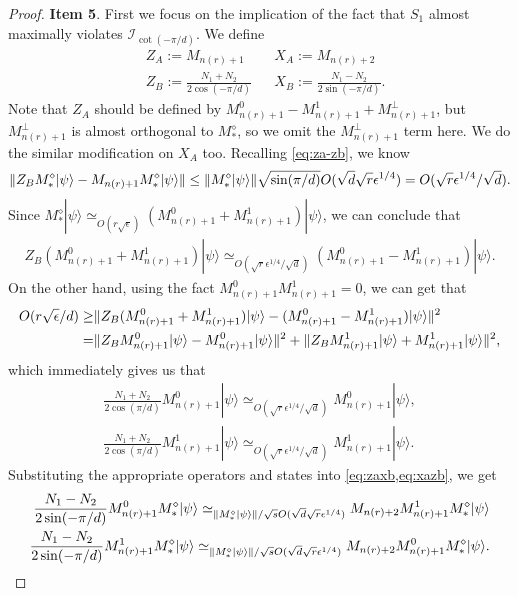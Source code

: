 \documentclass[11pt,letterpaper]{article}
\newcommand{\ket}[1]{|#1\rangle}
\DeclarePairedDelimiter{\norm}{\lVert}{\rVert}
\newcommand{\1}{\mathbb{1}}
\newcommand{\nr}{n(r)}
\newcommand{\I}{\mathcal{I}}
\newcommand{\se}{\sqrt{\epsilon}}
\newcommand{\qe}{\epsilon^{1/4}}
\newcommand{\sd}{\sqrt{d}}
\newcommand{\sr}{\sqrt{r}}
\newcommand{\appd}[1]{\simeq_{#1}}
\theoremstyle{definition}
\begin{document}
\begin{proof}
	\textbf{Item 5}.
	First we focus on the implication of the fact that $S_1$ almost maximally violates $\I_{\cot(-\pi/d)}$.
	We define
	\begin{align}
		&Z_A  := M_{\nr+1} && X_A := M_{\nr+2} \\
		&Z_B := \frac{N_1+N_2}{2\cos(-\pi/d)} && X_B := \frac{N_1-N_2}{2\sin(-\pi/d)}.
	\end{align}
	Note that $Z_A$ should be defined by $M_{\nr+1}^0 - M_{\nr+1}^1 + M_{\nr+1}^\perp$,
	but $M_{\nr+1}^\perp$ is almost orthogonal to $M_\ast^\diamond$, so we omit the $M_{\nr+1}^\perp$ term here.
	We do the similar modification on $X_A$ too.
	Recalling \cref{eq:za-zb}, we know
	\begin{align}
		\norm{Z_B M_\ast^\diamond \ket{\psi} - M_{\nr+1}M_\ast^\diamond \ket{\psi}} \leq 
		\norm{M_\ast^\diamond \ket{\psi}} \sqrt{\sin(\pi/d)}O(\sd \sr \qe)
		= O(\sr \qe/ \sd ).
	\end{align}
	Since $M_\ast^\diamond \ket{\psi} \appd{O(r\se)} (M_{\nr+1}^0 + M_{\nr+1}^1) \ket{\psi}$,
	we can conclude that 
	\begin{align}
		Z_B (M_{\nr+1}^0 + M_{\nr+1}^1) \ket{\psi} \appd{O(\sr \qe / \sd )} (M_{\nr+1}^0 - M_{\nr+1}^1) \ket{\psi}.
	\end{align}
	On the other hand, using the fact $M_{\nr+1}^0 M_{\nr+1}^1 = 0$, we can get that
	\begin{align}
		O(r\se/d) \geq &\norm{Z_B (M_{\nr+1}^0 + M_{\nr+1}^1) \ket{\psi} - (M_{\nr+1}^0 - M_{\nr+1}^1) \ket{\psi}}^2\\
		=&\norm{ Z_BM_{\nr+1}^0 \ket{\psi} - M_{\nr+1}^0\ket{\psi}}^2 + \norm{ Z_BM_{\nr+1}^1 \ket{\psi} + M_{\nr+1}^1\ket{\psi}}^2,
	\end{align}
	which immediately gives us that 
	\begin{align}
		\frac{N_1+N_2}{2\cos(\pi/d)} M_{\nr+1}^0\ket{\psi} \appd{O( \sr \qe /\sd)} M_{\nr+1}^0 \ket{\psi},\\
		\frac{N_1+N_2}{2\cos(\pi/d)} M_{\nr+1}^1\ket{\psi} \appd{O( \sr \qe /\sd)} M_{\nr+1}^1 \ket{\psi}.
	\end{align}
		Substituting the appropriate operators and states into \cref{eq:zaxb,eq:xazb}, we get
	\begin{align}
		\frac{N_1-N_2}{2 \sin(-\pi/d)} M_{\nr+1}^0M_\ast^\diamond \ket{\psi} 
		\appd{\norm{M_\ast^\diamond\ket{\psi}}/\sqrt{s} O(\sd \sr \qe)}M_{\nr+2} M_{\nr+1}^1M_\ast^\diamond\ket{\psi}\\
		\frac{N_1 -N_2}{2\sin(-\pi/d)} M_{\nr+1}^1M_\ast^\diamond \ket{\psi}  
		\appd{\norm{M_\ast^\diamond \ket{\psi}}/\sqrt{s}O(\sd \sr \qe)}M_{\nr+2} M_{\nr+1}^0 M_\ast^\diamond \ket{\psi}.

\end{align}
\end{proof}
\end{document}
